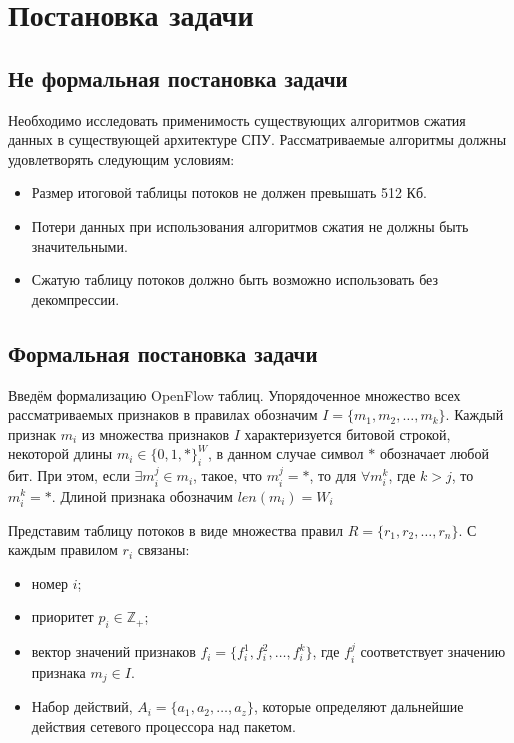 \documentclass[a4paper, 12pt, titlepage, finall]{extreport}
\begin{document}
    \chapter{Постановка задачи}
    \section{Не формальная постановка задачи}
        Необходимо исследовать применимость существующих алгоритмов сжатия данных в существующей архитектуре СПУ.
        Рассматриваемые алгоритмы должны удовлетворять следующим условиям:
        \begin{itemize}
            \item Размер итоговой таблицы потоков не должен превышать 512 Кб.
            \item Потери данных при использования алгоритмов сжатия не должны быть значительными.
            \item Сжатую таблицу потоков должно быть возможно использовать без декомпрессии.
        \end{itemize}

    \section{Формальная постановка задачи}
        \label{sect:problem}
        Введём формализацию OpenFlow таблиц.
        Упорядоченное множество всех рассматриваемых признаков в правилах обозначим \(I=\{m_1,m_2,\ldots,m_k\}\). 
        Каждый признак \(m_i\) из множества признаков \(I\) характеризуется битовой строкой, некоторой длины \(m_i \in \{0, 1, *\}^W_i\),
        в данном случае символ \(*\) обозначает любой бит. При этом, если \(\exists m_i^j \in m_i\), такое, что 
        \( m_i^j = *\), то для \( \forall m_i^k \), где \(k > j\), то \( m_i^k = *\). Длиной признака обозначим \(len(m_i) = W_i\)

        Представим таблицу потоков в виде множества правил \(R=\{r_1,r_2,\ldots,r_n\}\). С каждым правилом \(r_i\) связаны:
        \begin{itemize}
            \item номер \(i\);
            \item приоритет \(p_i\in \mathbb{Z}_+\);
            \item вектор значений признаков \(f_i=\{f_i^1,f_i^2,\ldots,f_i^k\}\), где \(f_i^j\) соответствует значению признака \(m_j\in I\). %
            \item Набор действий, \(A_i = \{a_1, a_2, \ldots, a_z\} \), которые определяют дальнейшие действия сетевого процессора над пакетом.
        \end{itemize}
\end{document}
